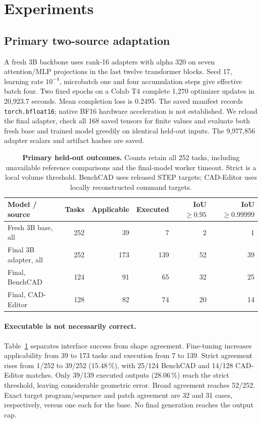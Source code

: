 \section{Experiments}
\label{sec:experiments}
\subsection{Primary two-source adaptation}
A fresh 3B backbone uses rank-16 adapters with alpha 320 on seven attention/MLP projections in the last twelve transformer blocks. Seed 17, learning rate $10^{-4}$, microbatch one and four accumulation steps give effective batch four. Two fixed epochs on a Colab T4 complete 1,270 optimizer updates in 20,923.7 seconds. Mean completion loss is 0.2495. The saved manifest records \texttt{torch.bfloat16}; native BF16 hardware acceleration is not established. We reload the final adapter, check all 168 saved tensors for finite values and evaluate both fresh base and trained model greedily on identical held-out inputs. The 9,977,856 adapter scalars and artifact hashes are saved.

\begin{table}[t]
\centering\small
\setlength{\tabcolsep}{8pt}
\begin{tabular}{lrrrrr}
\toprule
Model / source & Tasks & Applicable & Executed & IoU $\geq0.95$ & IoU $\geq0.99999$ \\
\midrule
Fresh 3B base, all & 252 & 39 & 7 & 2 & 1 \\
Final 3B adapter, all & 252 & 173 & 139 & 52 & 39 \\
Final, BenchCAD & 124 & 91 & 65 & 32 & 25 \\
Final, CAD-Editor & 128 & 82 & 74 & 20 & 14 \\
\bottomrule
\end{tabular}
\caption{\textbf{Primary held-out outcomes.} Counts retain all 252 tasks, including unavailable reference comparisons and the final-model worker timeout. Strict is a local volume threshold. BenchCAD uses released STEP targets; CAD-Editor uses locally reconstructed command targets.}
\label{tab:primary}
\end{table}

\paragraph{Executable is not necessarily correct.}
Table~\ref{tab:primary} separates interface success from shape agreement. Fine-tuning increases applicability from 39 to 173 tasks and execution from 7 to 139. Strict agreement rises from 1/252 to 39/252 (15.48\,\%), with 25/124 BenchCAD and 14/128 CAD-Editor matches. Only 39/139 executed outputs (28.06\,\%) reach the strict threshold, leaving considerable geometric error. Broad agreement reaches 52/252. Exact target program/sequence and patch agreement are 32 and 31 cases, respectively, versus one each for the base. No final generation reaches the output cap.

